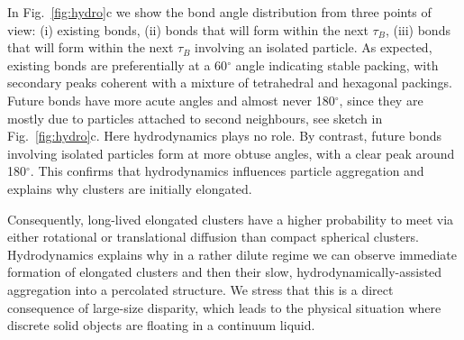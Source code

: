 \documentclass[footinbib,amsmath,amssymb,superscriptaddress,twocolumn]{revtex4}
\begin{document}
In Fig.~\ref{fig:hydro}c we show the bond angle distribution from three points of view: (i) existing bonds, (ii) bonds that will form within the next $\tau_B$, (iii) bonds that will form within the next $\tau_B$ involving an isolated particle. As expected, existing bonds are preferentially at a 60$^\circ$ angle indicating stable packing, with secondary peaks coherent with a mixture of tetrahedral and hexagonal packings. Future bonds have more acute angles and almost never 180$^\circ$, since they are mostly due to particles attached to second neighbours, see sketch in Fig.~\ref{fig:hydro}c. Here hydrodynamics plays no role. By contrast, future bonds involving isolated particles form at more obtuse angles, with a clear peak around 180$^\circ$. This confirms that hydrodynamics influences particle aggregation and explains why clusters are initially elongated.

Consequently, long-lived elongated clusters have a higher probability to meet via either rotational or translational diffusion than compact spherical clusters. 
Hydrodynamics explains why in a rather dilute regime we can observe immediate formation of elongated clusters and then their slow, hydrodynamically-assisted aggregation into a percolated structure.
We stress that this is a direct consequence of large-size disparity, which leads to the physical situation where discrete solid objects are floating in a continuum liquid.
\end{document}
